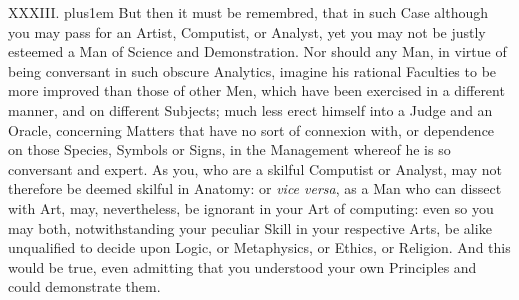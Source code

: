 
\medbreak

XXXIII. \hskip 0pt plus1em
But then it must be remembred, that in such Case although you
may pass for an Artist, Computist, or Analyst, yet you may not be
justly esteemed a Man of Science and Demonstration.  Nor should
any Man, in virtue of being conversant in such obscure Analytics,
imagine his rational Faculties to be more improved than those of
other Men, which have been exercised in a different manner, and
on different Subjects; much less erect himself into a Judge and
an Oracle, concerning Matters that have no sort of connexion
with, or dependence on those Species, Symbols or Signs, in the
Management whereof he is so conversant and expert.  As you, who
are a skilful Computist or Analyst, may not therefore be deemed
skilful in Anatomy: or {\it vice versa}, as a Man who can dissect
with Art, may, nevertheless, be ignorant in your Art of
computing: even so you may both, notwithstanding your peculiar
Skill in your respective Arts, be alike unqualified to decide
upon Logic, or Metaphysics, or Ethics, or Religion.  And this
would be true, even admitting that you understood your own
Principles and could demonstrate them.

\medbreak

